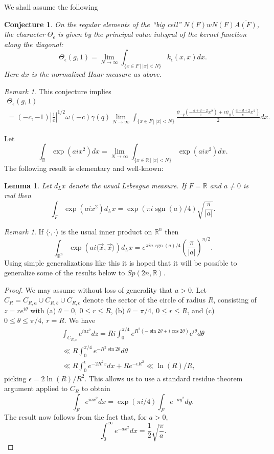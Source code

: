 \documentclass[12pt,letterpaper,openany]{book}
\theoremstyle{plain}
\newtheorem{lemma}[theorem]{Lemma}
\newtheorem{conjecture}[theorem]{Conjecture}
\theoremstyle{definition}
\theoremstyle{remark}
\newtheorem{remark}[theorem]{Remark}
\theoremstyle{remark}
\DeclareMathOperator{\sgn}{sgn}
\begin{document}
We shall assume the following

\begin{conjecture}
On the regular elements of the ``big cell''
$N(F)wN(F)\overline{A(F)}$, the character $\Theta_\epsilon$
is given by the principal
value integral of the kernel function along the diagonal:
\[
\Theta_\epsilon(g,1)=
\lim_{N\rightarrow \infty}
\int_{\{x\in F\ |\ |x|<N\}}
k_\epsilon(x,x)dx.
\]
Here $dx$ is the normalized Haar measure as above.
\end{conjecture}

\begin{remark} This conjecture implies
\[
\begin{array}{c}
\Theta_\epsilon(g,1)\\
=(-c,-1)|{\frac{1}{c}}|^{1/2}\omega(-c)\gamma(q)
\lim_{N\rightarrow \infty}
\int_{\{x\in F\ |\ |x|<N\}}
{\frac{\psi_{-q}(-{\frac{a+d-2}{c}}x^2)
+\epsilon \psi_q({\frac{a+d+2}{c}}x^2)}{2}}dx.
\end{array}
\]
\end{remark}

Let
\[
\int_{\mathbb{R}} \exp(aix^2)dx
=\lim_{N\rightarrow \infty}
\int_{\{x\in {\mathbb{R}}\ |\ |x|<N\}} \exp(aix^2)dx.
\]
The following result is elementary and well-known:

\begin{lemma}\label{lem:gauss} Let $d_Lx$ denote the usual Lebesgue measure.
If $F=\mathbb{R}$ and $a\not= 0$ is real then
\[
\int_{F} \exp(aix^2)d_Lx =\exp(\pi i \sgn(a)/4)\sqrt{\frac{\pi}{|a|}}.
\]
\end{lemma}

\begin{remark}
If $\langle\cdot,\cdot\rangle$ is the usual inner product on
${\mathbb R}^n$ then
\[
\int_{{\mathbb R}^n} \exp(ai\langle\vec{x},\vec{x}\rangle)d_L x =e^{\pi i n\,\sgn(a)/4}({\frac{\pi}{|a|}})^{n/2}.
\]
Using simple generalizations like this it is hoped that it will
be possible to generalize some of the results below to
$\overline{Sp(2n,{\mathbb{R}})}$.
\end{remark}

\begin{proof} We may assume without loss of generality that $a>0$.
Let $C_R=C_{R,a}\cup C_{R,b}\cup C_{R,c}$
denote the sector of the circle of radius $R$,
consisting of $z=re^{i\theta}$ with (a) $\theta=0,\ 0\leq r\leq R$,
(b) $\theta=\pi/4,\ 0\leq r\leq R$, and (c) $0\leq \theta \leq \pi/4,\ r=R$.
We have
\[
\begin{array}{c}
\int_{C_{R,c}} e^{iaz^2}dz=
Ri\int_0^{\pi/4} e^{R^2(-\sin 2\theta +i\cos 2\theta )}e^{i\theta} d\theta\\
\ll  R\int_0^{\pi/4} e^{-R^2\sin 2\theta }d\theta\\
\ll  R\int_0^{\epsilon} e^{-2R^2x}dx +Re^{-\epsilon R^2}
\ll \ln(R)/R,
\end{array}
\]
picking $\epsilon =2\ln(R)/R^2$.
This allows us to use a standard residue theorem argument
applied to $C_R$ to obtain
\[
\int_F e^{iax^2}dx=\exp(\pi i/4)\int_F e^{-ay^2}dy.
\]
The result now follows from the fact that, for $a>0$,
\[
\int_0^\infty e^{-ax^2}dx={\frac{1}{2}}\sqrt{\frac{\pi}{a}}.
\]
\end{proof}
\end{document}
